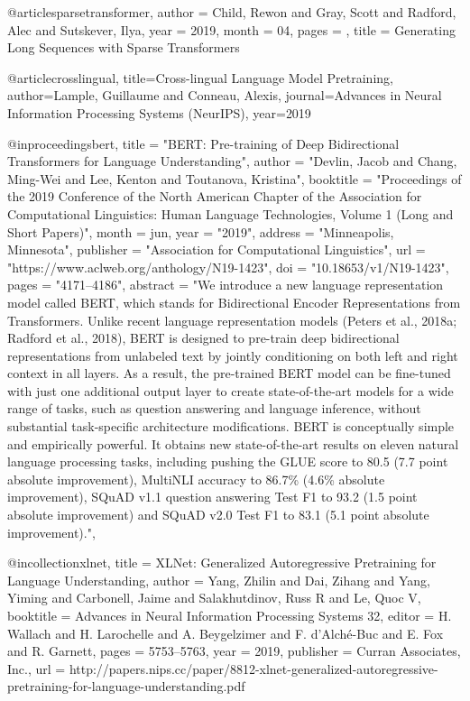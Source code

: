 @article{sparsetransformer,
author = {Child, Rewon and Gray, Scott and Radford, Alec and Sutskever, Ilya},
year = {2019},
month = {04},
pages = {},
title = {Generating Long Sequences with Sparse Transformers}
}

@article{crosslingual,
  title={Cross-lingual Language Model Pretraining},
  author={Lample, Guillaume and Conneau, Alexis},
  journal={Advances in Neural Information Processing Systems (NeurIPS)},
  year={2019}
}

@inproceedings{bert,
    title = "{BERT}: Pre-training of Deep Bidirectional Transformers for Language Understanding",
    author = "Devlin, Jacob  and
      Chang, Ming-Wei  and
      Lee, Kenton  and
      Toutanova, Kristina",
    booktitle = "Proceedings of the 2019 Conference of the North {A}merican Chapter of the Association for Computational Linguistics: Human Language Technologies, Volume 1 (Long and Short Papers)",
    month = jun,
    year = "2019",
    address = "Minneapolis, Minnesota",
    publisher = "Association for Computational Linguistics",
    url = "https://www.aclweb.org/anthology/N19-1423",
    doi = "10.18653/v1/N19-1423",
    pages = "4171--4186",
    abstract = "We introduce a new language representation model called BERT, which stands for Bidirectional Encoder Representations from Transformers. Unlike recent language representation models (Peters et al., 2018a; Radford et al., 2018), BERT is designed to pre-train deep bidirectional representations from unlabeled text by jointly conditioning on both left and right context in all layers. As a result, the pre-trained BERT model can be fine-tuned with just one additional output layer to create state-of-the-art models for a wide range of tasks, such as question answering and language inference, without substantial task-specific architecture modifications. BERT is conceptually simple and empirically powerful. It obtains new state-of-the-art results on eleven natural language processing tasks, including pushing the GLUE score to 80.5 (7.7 point absolute improvement), MultiNLI accuracy to 86.7{\%} (4.6{\%} absolute improvement), SQuAD v1.1 question answering Test F1 to 93.2 (1.5 point absolute improvement) and SQuAD v2.0 Test F1 to 83.1 (5.1 point absolute improvement).",
}

@incollection{xlnet,
title = {XLNet: Generalized Autoregressive Pretraining for Language Understanding},
author = {Yang, Zhilin and Dai, Zihang and Yang, Yiming and Carbonell, Jaime and Salakhutdinov, Russ R and Le, Quoc V},
booktitle = {Advances in Neural Information Processing Systems 32},
editor = {H. Wallach and H. Larochelle and A. Beygelzimer and F. d'Alch\'{e}-Buc and E. Fox and R. Garnett},
pages = {5753--5763},
year = {2019},
publisher = {Curran Associates, Inc.},
url = {http://papers.nips.cc/paper/8812-xlnet-generalized-autoregressive-pretraining-for-language-understanding.pdf}
}

